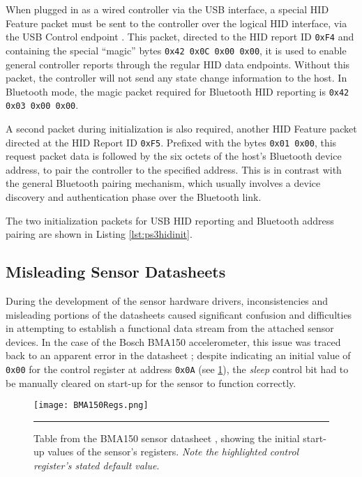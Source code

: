 When plugged in as a wired controller via the USB interface, a special HID Feature packet must be sent to the controller over the logical HID interface, via the USB Control endpoint \cite{ps3reveng}. This packet, directed to the HID report ID \texttt{0xF4} and containing the special ``magic'' bytes \texttt{0x42 0x0C 0x00 0x00}, it is used to enable general controller reports through the regular HID data endpoints. Without this packet, the controller will not send any state change information to the host. In Bluetooth mode, the magic packet required for Bluetooth HID reporting is \texttt{0x42 0x03 0x00 0x00}.

A second packet during initialization is also required, another HID Feature packet directed at the HID Report ID \texttt{0xF5}. Prefixed with the bytes \texttt{0x01 0x00}, this request packet data is followed by the six octets of the host's Bluetooth device address, to pair the controller to the specified address. This is in contrast with the general Bluetooth pairing mechanism, which usually involves a device discovery and authentication phase over the Bluetooth link.

The two initialization packets for USB HID reporting and Bluetooth address pairing are shown in Listing \ref{lst:ps3hidinit}.



\FloatBarrier
\subsection{Misleading Sensor Datasheets}

During the development of the sensor hardware drivers, inconsistencies and misleading portions of the datasheets caused significant confusion and difficulties in attempting to establish a functional data stream from the attached sensor devices. In the case of the Bosch BMA150 accelerometer, this issue was traced back to an apparent error in the datasheet \cite{bma150}; despite indicating an initial value of \texttt{0x00} for the control register at address \texttt{0x0A} (see \ref{fig:bma150regs}), the \textit{sleep} control bit had to be manually cleared on start-up for the sensor to function correctly.

\begin{figure}[tbph]
	\centering
		\texttt{[image: BMA150Regs.png]}
	\rule{35em}{0.5pt}
	\caption[BMA150 Register Defaults]{Table from the BMA150 sensor datasheet \cite{bma150}, showing the initial start-up values of the sensor's registers. \textit{Note the highlighted control register's stated default value}.}
	\label{fig:bma150regs}
\end{figure}

